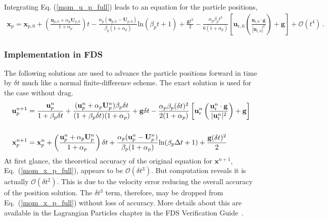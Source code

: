 Integrating Eq. (\ref{mom_u_p_full}) leads to an equation for the particle positions,
\begin{align}
    \label{mom_x_p_full}
    \mathbf{x}_p = \mathbf{x}_{p,0} + \left(\frac{\mathbf{u}_{p,0} + \alpha_p \mathbf{U}_{p,0}}{1 + \alpha_p}\right) t - \frac{\alpha_p (\mathbf{u}_{p,0} - \mathbf{U}_{p,0})}{\beta_p (1 + \alpha_p)} \text{ln}(\beta_p t + 1) + \frac{\mathbf{g} t^2}{2} - \frac{\alpha_p \beta_p t^3}{6 (1 + \alpha_p)} \left[\mathbf{u}_{\text{r},0} \left(\frac{\mathbf{u}_{\text{r},0} \cdot \mathbf{g}}{|\mathbf{u}_{\text{r},0}|^2}\right) + \mathbf{g}\right] + \mathcal{O}(t^4) \,.
\end{align}

\subsubsection{Implementation in FDS}

The following solutions are used to advance the particle positions forward in time by $\delta t$ much like a normal finite-difference scheme. The exact solution is used for the case without drag.
\begin{align}
    \mathbf{u}_p^{n+1} &= \frac{\mathbf{u}_p^n}{1 + \beta_p \delta t} + \frac{(\mathbf{u}_p^n + \alpha_p \mathbf{U}_p^n)\beta_p \delta t}{(1 + \beta_p \delta t)(1 + \alpha_p)} + \mathbf{g} \delta t - \frac{\alpha_p \beta_p (\delta t)^2}{2 (1 + \alpha_p)} \left[\mathbf{u}_\text{r}^n \left(\frac{\mathbf{u}_\text{r}^n \cdot \mathbf{g}}{|\mathbf{u}_\text{r}^n|^2}\right) + \mathbf{g}\right] \\
    & \notag \\
    \mathbf{x}_p^{n+1} &= \mathbf{x}_p^n + \left(\frac{\mathbf{u}_p^n + \alpha_p \mathbf{U}_p^n}{1 + \alpha_p}\right) \delta t + \frac{\alpha_p (\mathbf{u}_p^n - \mathbf{U}_p^n)}{\beta_p (1 + \alpha_p)} \text{ln}(\beta_p \Delta t + 1) + \frac{\mathbf{g} (\delta t)^2}{2}
\end{align}
At first glance, the theoretical accuracy of the original equation for $\mathbf{x}^{n+1}$, Eq.~(\ref{mom_x_p_full}), appears to be $\mathcal{O}(\delta t^3)$. But computation reveals it is actually $\mathcal{O}(\delta t^2)$. This is due to the velocity error reducing the overall accuracy of the position solution. The $\delta t^3$ term, therefore, may be dropped from Eq.~(\ref{mom_x_p_full}) without loss of accuracy. More details about this are available in the Lagrangian Particles chapter in the FDS Verification Guide~\cite{FDS_Verification_Guide}.



